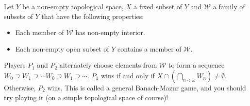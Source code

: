 \documentclass{article}
\begin{document}
\begin{exercise}
Let $Y$ be a non-empty topological space, $X$ a fixed subset of $Y$ and \(\mathcal{W}\) a family of subsets of $Y$ that have the following properties:
\begin{itemize}
    \item Each member of $\mathcal {W}$ has non-empty interior.
    \item Each non-empty open subset of $Y$ contains a member of $\mathcal {W}$. 
\end{itemize}
Players $P_{1}$ and $P_{2}$ alternately choose elements from $\mathcal {W}$ to form a sequence $W_{0}\supseteq W_{1}\supseteq \cdots W_{0}\supseteq W_{1}\supseteq \cdots$.
$P_{1}$ wins if and only if $X\cap \left(\bigcap _{n<\omega }W_{n}\right)\neq \emptyset$. 
Otherwise, $P_{2}$ wins.
This is called a general Banach-Mazur game, and you should try playing it (on a simple topological space of course)!

\end{exercise}
\end{document}
